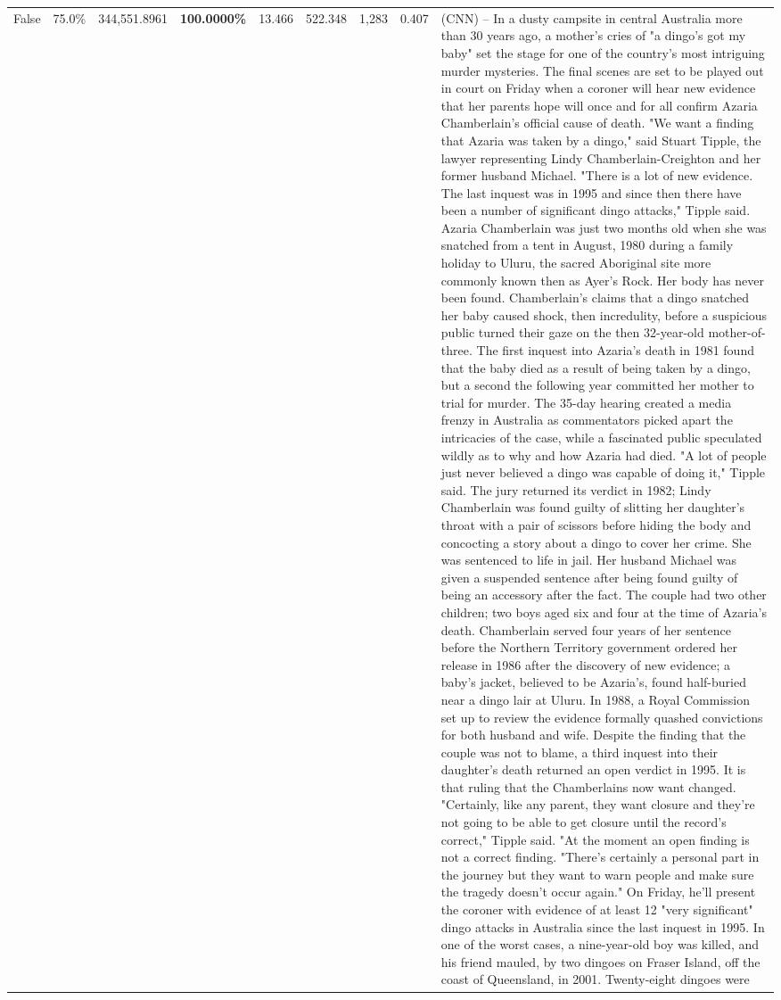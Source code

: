 \begin{table}[H]
\begin{tabular}{lllrlllll}
False & 75.0\% & 344,551.8961 & \bfseries \color{red} 100.0000\% & 13.466 & 522.348 & 1,283 & 0.407 & (CNN) -- In a dusty campsite in central Australia more than 30 years ago, a mother's cries of "a dingo's got my baby" set the stage for one of the country's most intriguing murder mysteries. The final scenes are set to be played out in court on Friday when a coroner will hear new evidence that her parents hope will once and for all confirm Azaria Chamberlain's official cause of death. "We want a finding that Azaria was taken by a dingo," said Stuart Tipple, the lawyer representing Lindy Chamberlain-Creighton and her former husband Michael. "There is a lot of new evidence. The last inquest was in 1995 and since then there have been a number of significant dingo attacks," Tipple said. Azaria Chamberlain was just two months old when she was snatched from a tent in August, 1980 during a family holiday to Uluru, the sacred Aboriginal site more commonly known then as Ayer's Rock. Her body has never been found. Chamberlain's claims that a dingo snatched her baby caused shock, then incredulity, before a suspicious public turned their gaze on the then 32-year-old mother-of-three. The first inquest into Azaria's death in 1981 found that the baby died as a result of being taken by a dingo, but a second the following year committed her mother to trial for murder. The 35-day hearing created a media frenzy in Australia as commentators picked apart the intricacies of the case, while a fascinated public speculated wildly as to why and how Azaria had died. "A lot of people just never believed a dingo was capable of doing it," Tipple said. The jury returned its verdict in 1982; Lindy Chamberlain was found guilty of slitting her daughter's throat with a pair of scissors before hiding the body and concocting a story about a dingo to cover her crime. She was sentenced to life in jail. Her husband Michael was given a suspended sentence after being found guilty of being an accessory after the fact. The couple had two other children; two boys aged six and four at the time of Azaria's death. Chamberlain served four years of her sentence before the Northern Territory government ordered her release in 1986 after the discovery of new evidence; a baby's jacket, believed to be Azaria's, found half-buried near a dingo lair at Uluru. In 1988, a Royal Commission set up to review the evidence formally quashed convictions for both husband and wife. Despite the finding that the couple was not to blame, a third inquest into their daughter's death returned an open verdict in 1995. It is that ruling that the Chamberlains now want changed. "Certainly, like any parent, they want closure and they're not going to be able to get closure until the record's correct," Tipple said. "At the moment an open finding is not a correct finding. "There's certainly a personal part in the journey but they want to warn people and make sure the tragedy doesn't occur again." On Friday, he'll present the coroner with evidence of at least 12 "very significant" dingo attacks in Australia since the last inquest in 1995. In one of the worst cases, a nine-year-old boy was killed, and his friend mauled, by two dingoes on Fraser Island, off the coast of Queensland, in 2001. Twenty-eight dingoes were 
\end{tabular}
\end{table}
